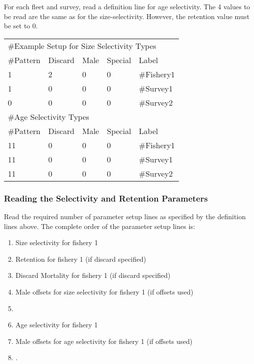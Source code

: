For each fleet and survey, read a definition line for age selectivity.  The 4 values to be read are the same as for the size-selectivity.  However, the retention value must be set to 0.

\begin{center}
	\begin{longtable}{p{2cm} p{2cm} p{2cm} p{2cm} p{6.5cm} }
		\hline
		\multicolumn{5}{l}{\#Example Setup for Size Selectivity Types}\\
		\#Pattern & Discard & Male & Special & Label \\
		\hline
		1  & 2 & 0 & 0 & \#Fishery1\\
		1  & 0 & 0 & 0 & \#Survey1\\
		0  & 0 & 0 & 0 & \#Survey2\\
		\hline
		\multicolumn{5}{l}{\#Age Selectivity Types}\\
		\#Pattern & Discard & Male & Special & Label \\
		\hline
		11  & 0 & 0 & 0 & \#Fishery1\\
		11  & 0 & 0 & 0 & \#Survey1\\
		11  & 0 & 0 & 0 & \#Survey2\\
		\hline
	\end{longtable}
\end{center}

\subsubsection{Reading the Selectivity and Retention Parameters}
Read the required number of parameter setup lines as specified by the definition lines above.  The complete order of the parameter setup lines is:
\begin{enumerate}
	\item Size selectivity for fishery 1
	\item Retention for fishery 1 (if discard specified)
	\item Discard Mortality for fishery 1 (if discard specified)
	\item Male offsets for size selectivity for fishery 1 (if offsets used)
	\item <repeat for additional fleets and surveys>
	\item Age selectivity for fishery 1
	\item Male offsets for age selectivity for fishery 1 (if offsets used)
	\item <repeat for additional fleets and surveys>.
\end{enumerate}

